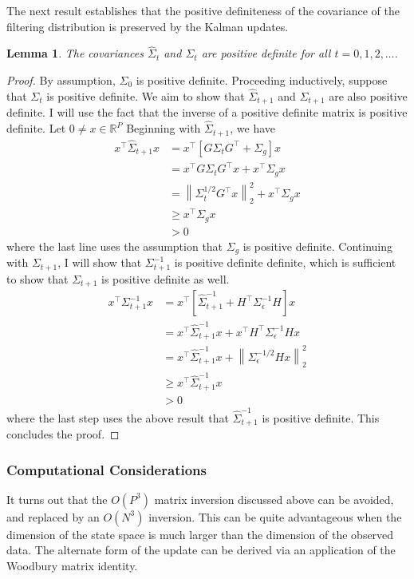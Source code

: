 \documentclass[12pt]{article}
\newcommand*{\norm}[1]{\left\lVert#1\right\rVert}
\newcommand{\R}{\mathbb{R}}
\newtheorem{lemma}{Lemma}
\begin{document}
The next result establishes that the positive definiteness of the covariance of the filtering distribution is preserved by the Kalman updates. 

\begin{lemma} 
The covariances $\hat{\Sigma}_t$ and $\Sigma_t$ are positive definite for all $t = 0, 1, 2, \dots$. 
\end{lemma}

\begin{proof}
By assumption, $\Sigma_0$ is positive definite. Proceeding inductively, suppose that $\Sigma_t$ is positive definite. We aim to show that $\hat{\Sigma}_{t+1}$
and $\Sigma_{t + 1}$ are also positive definite. I will use the fact that the inverse of a positive definite matrix is positive definite. Let $0 \neq x \in \R^P$ 
Beginning with $\hat{\Sigma}_{t+1}$, we have 
\begin{align*}
x^{\top} \hat{\Sigma}_{t+1} x &= x^{\top} \left[G \Sigma_t G^{\top} + \Sigma_g \right] x \\
				      &= x^{\top} G \Sigma_t G^{\top} x + x^{\top} \Sigma_g x \\
				      &= \norm{\Sigma_t^{1/2}G^\top x}_2^2 + x^\top \Sigma_g x \\
				      &\geq x^\top \Sigma_g x \\
				      &> 0
\end{align*}
where the last line uses the assumption that $\Sigma_g$ is positive definite. Continuing with $\Sigma_{t+1}$, I will show that $\Sigma^{-1}_{t+1}$
is positive definite definite, which is sufficient to show that $\Sigma_{t+1}$ is positive definite as well. 
\begin{align*}
x^{\top} \Sigma_{t + 1}^{-1} x &= x^{\top} \left[\hat{\Sigma}^{-1}_{t+1} + H^{\top} \Sigma_\epsilon^{-1}H \right] x \\
				       &= x^{\top} \hat{\Sigma}^{-1}_{t+1} x + x^{\top} H^{\top} \Sigma_\epsilon^{-1}H x \\
				       &= x^{\top} \hat{\Sigma}^{-1}_{t+1} x + \norm{\Sigma_\epsilon^{-1/2} H x}_2^2 \\
				       &\geq x^{\top} \hat{\Sigma}^{-1}_{t+1} x \\
				       &> 0
\end{align*}
where the last step uses the above result that $\hat{\Sigma}^{-1}_{t+1}$ is positive definite. This concludes the proof. 
\end{proof}

\subsubsection{Computational Considerations}
It turns out that the $O(P^3)$ matrix inversion discussed above can be avoided, and replaced by an $O(N^3)$ inversion. This can be quite advantageous 
when the dimension of the state space is much larger than the dimension of the observed data. The alternate form of the update can be derived via an 
application of the Woodbury matrix identity. 
\end{document}
